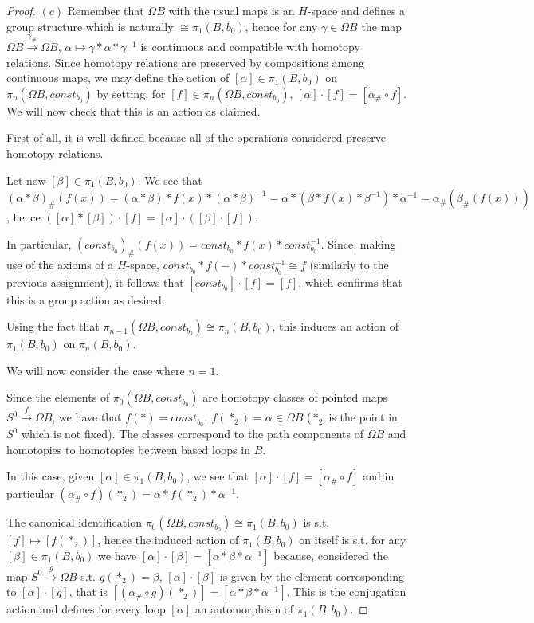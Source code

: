 \documentclass{article}
\begin{document}
\begin{proof}
    $(c)$ Remember that $\Omega B$ with the usual maps is an $H$-space
    and defines a group structure which is naturally $\cong\pi_1(B,b_0)$,
    hence for any $\gamma\in\Omega B$ the map $\Omega
    B\xrightarrow{\gamma_\#}\Omega B$, $\alpha\mapsto
    \gamma*\alpha*\gamma^{-1}$ is continuous and compatible with homotopy
    relations. Since homotopy relations are preserved by compositions among
    continuous maps, we may define the action of $[\alpha]\in\pi_1(B,b_0)$ on
    $\pi_n(\Omega B,const_{b_0})$ by setting, for
    $[f]\in\pi_n(\Omega B,const_{b_0})$, $[\alpha]\cdot [f]=[\alpha_\#\circ f]$.
    We will now check that this is an action as claimed.
    
    First of all, it is well defined because all of the operations considered
    preserve homotopy relations.

    Let now $[\beta]\in\pi_1(B,b_0)$. We see that
    $(\alpha*\beta)_\#(f(x))=(\alpha*\beta)*f(x)*(\alpha*\beta)^{-1}=
\alpha*(\beta*f(x)*\beta^{-1})*\alpha^{-1}=\alpha_\#(\beta_\#(f(x)))$, hence
    $([\alpha]*[\beta])\cdot [f]=[\alpha]\cdot ([\beta]\cdot [f])$.

    In particular, $(const_{b_0})_\#(f(x))=const_{b_0}*f(x)*const_{b_0}^{-1}$.
    Since, making use of the axioms of a $H$-space,
    $const_{b_0}*f(-)*const_{b_0}^{-1}\cong f$ (similarly to the previous
    assignment), it follows that $[const_{b_0}]\cdot [f]=[f]$, which confirms
    that this is a group action as desired.

    Using the fact that $\pi_{n-1}(\Omega B,const_{b_0})\cong\pi_n(B,b_0)$,
    this induces an action of $\pi_1(B,b_0)$ on $\pi_n(B,b_0)$.

    We will now consider the case where $n=1$.
    
    Since the elements of $\pi_0(\Omega B,const_{b_0})$ are homotopy classes
    of pointed maps $S^0\xrightarrow{f}\Omega B$, we have that
    $f(*)=const_{b_0},\ f(*_2)=\alpha\in\Omega
    B$ ($*_2$ is the point in $S^0$ which is not fixed). The
    classes correspond to the path components of $\Omega B$ and homotopies to
    homotopies between based loops in $B$.

    In this case, given $[\alpha]\in\pi_1(B,b_0)$, we see that
    $[\alpha]\cdot[f]=[\alpha_\#\circ f]$ and in particular $(\alpha_\#\circ
    f)(*_2)=\alpha*f(*_2)*\alpha^{-1}$.

    The canonical identification $\pi_0(\Omega
    B,const_{b_0})\cong\pi_1(B,b_0)$ is s.t. $[f]\mapsto [f(*_2)]$, hence the
    induced action of $\pi_1(B,b_0)$ on itself is s.t. for
    any $[\beta]\in\pi_1(B,b_0)$ we have
    $[\alpha]\cdot[\beta]=[\alpha*\beta*\alpha^{-1}]$ because, considered the
    map $S^0\xrightarrow{g}\Omega B$ s.t. $g(*_2)=\beta$, $[\alpha]\cdot[\beta]$
    is given by the element corresponding to $[\alpha]\cdot [g]$, that is
    $[(\alpha_\#\circ g)(*_2)]=[\alpha*\beta*\alpha^{-1}]$. This is
    the conjugation action and defines for every loop $[\alpha]$ an automorphism
    of $\pi_1(B,b_0)$.
\end{proof}

\printbibliography
\end{document}
